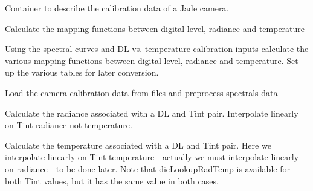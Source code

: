 \documentclass[a4paper,10pt,english]{sphinxmanual}
\begin{document}
\begin{fulllineitems}
\label{ryptw:pyradi.ryptw.JadeCalibrationData}
Container to describe the calibration data of a Jade camera.

\begin{fulllineitems}
\label{ryptw:pyradi.ryptw.JadeCalibrationData.CalculateCalibrationTables}
Calculate the mapping functions between digital level, radiance and temperature

Using the spectral curves and DL vs. temperature calibration inputs
calculate the various mapping functions between digital level, radiance
and temperature. Set up the various tables for later conversion.

\end{fulllineitems}


\begin{fulllineitems}
\label{ryptw:pyradi.ryptw.JadeCalibrationData.LoadPrepareData}
Load the camera calibration data from files and preprocess spectrals data

\end{fulllineitems}


\begin{fulllineitems}
\label{ryptw:pyradi.ryptw.JadeCalibrationData.LookupDLRad}
Calculate the radiance associated with a DL and Tint pair.
Interpolate linearly on Tint radiance not temperature.

\end{fulllineitems}


\begin{fulllineitems}
\label{ryptw:pyradi.ryptw.JadeCalibrationData.LookupDLTemp}
Calculate the temperature associated with a DL and Tint pair.
Here we interpolate linearly on Tint temperature - actually we must
interpolate linearly on radiance - to be done later.
Note that dicLookupRadTemp is available for both Tint values, but
it has the same value in both cases.


\end{fulllineitems}
\end{fulllineitems}
\end{document}
